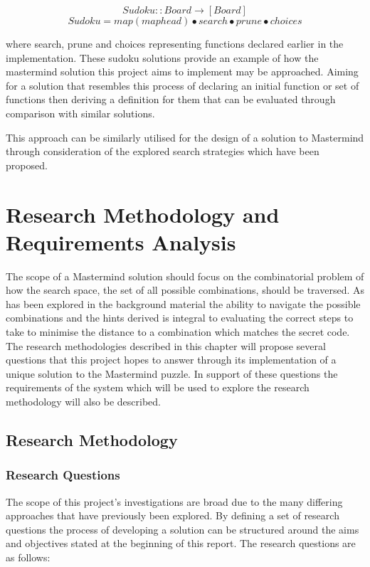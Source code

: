 \documentclass[11pt]{article}  %
\theoremstyle{definition}
\theoremstyle{remark}
\begin{document}
\[ Sudoku :: Board \rightarrow [Board]\]
\[ Sudoku = map (map head) \bullet search \bullet prune \bullet choices\]

where search, prune and choices representing functions declared earlier in the implementation. These sudoku solutions provide an example of how the mastermind solution this project aims to implement may be approached. Aiming for a solution that resembles this process of declaring an initial function or set of functions then deriving a definition for them that can be evaluated through comparison with similar solutions.

This approach can be similarly utilised for the design of a solution to Mastermind through consideration of the explored search strategies which have been proposed.

\newpage                     %
\section{Research Methodology and Requirements Analysis}\label{ss:back}

The scope of a Mastermind solution should focus on the combinatorial problem of how the search space, the set of all possible combinations, should be traversed. As has been explored in the background material the ability to navigate the possible combinations and the hints derived is integral to evaluating the correct steps to take to minimise the distance to a combination which matches the secret code. The research methodologies described in this chapter will propose several questions that this project hopes to answer through its implementation of a unique solution to the Mastermind puzzle. In support of these questions the requirements of the system which will be used to explore the research methodology will also be described.

\subsection {Research Methodology}

\subsubsection {Research Questions}

The scope of this project's investigations are broad due to the many differing approaches that have previously been explored. By defining a set of research questions the process of developing a solution can be structured around the aims and objectives stated at the beginning of this report. The research questions are as follows:
\end{document}
